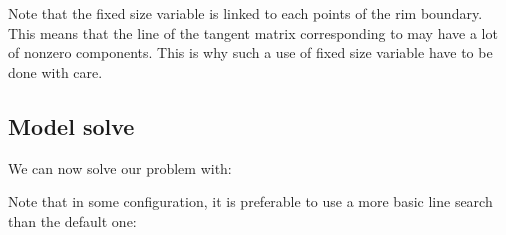 \documentclass[a4paper,11pt,english]{sphinxmanual}
\begin{document}
\begin{sphinxVerbatim}[commandchars=\\\{\}]
 
\end{sphinxVerbatim}

\sphinxAtStartPar
Note that the fixed size variable  is linked to each points of the rim boundary. This means that the line of the tangent matrix corresponding to  may have a lot of nonzero components. This is why such a use of fixed size variable have to be done with care.


\subsection{Model solve}
\label{\detokenize{tutorial/wheel:model-solve}}
\sphinxAtStartPar
We can now solve our problem with:

\begin{sphinxVerbatim}[commandchars=\\\{\}]
    
\end{sphinxVerbatim}

\sphinxAtStartPar
Note that in some configuration, it is preferable to use a more basic line search than the default one:

\begin{sphinxVerbatim}[commandchars=\\\{\}]
         
\end{sphinxVerbatim}
\end{document}
